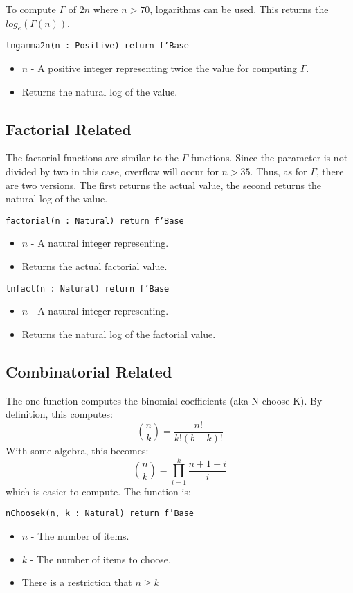 \documentclass[10pt, openany]{book}
\newcommand{\function}[1]{\texttt{#1}}
\begin{document}
To compute $\Gamma$ of $2n$ where $n>70$, logarithms can be used.  This returns the $log_e(\Gamma(n))$.

\function{lngamma2n(n : Positive) return f'Base}
\begin{itemize}
  \item $n$ - A positive integer representing twice the value for computing $\Gamma$.
  \item Returns the natural log of the value.
\end{itemize}

\subsection{Factorial Related}
The factorial functions are similar to the $\Gamma$ functions.  Since the parameter is not divided by two in this case, overflow will occur for $n>35$.  Thus, as for $\Gamma$, there are two versions.  The first returns the actual value, the second returns the natural log of the value.

\function{factorial(n : Natural) return f'Base}
\begin{itemize}
  \item $n$ - A natural integer representing.
  \item Returns the actual factorial value.
\end{itemize}
\function{lnfact(n : Natural) return f'Base}
\begin{itemize}
  \item $n$ - A natural integer representing.
  \item Returns the natural log of the factorial value.
\end{itemize}

\subsection{Combinatorial Related}
The one function computes the binomial coefficients (aka N choose K).  By definition, this computes:
\begin{displaymath}
  \binom{n}{k} = \frac{n!}{k!(b-k)!}
\end{displaymath}
With some algebra, this becomes:
\begin{displaymath}
  \binom{n}{k} = \prod^k_{i=1}\frac{n+1-i}{i}
\end{displaymath}
 which is easier to compute.  The function is:

\function{nChoosek(n, k : Natural) return f'Base}
\begin{itemize}
  \item $n$ - The number of items.
  \item $k$ - The number of items to choose.
  \item There is a restriction that $n\geq{}k$
\end{itemize}
\end{document}
